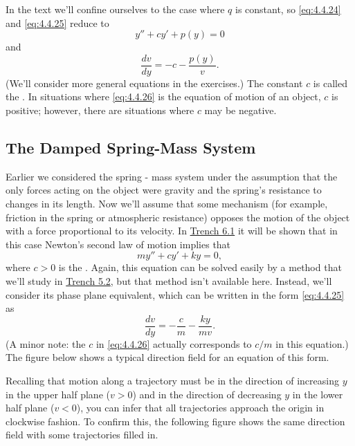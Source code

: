 \documentclass{ximera}
\begin{document}
In the text we'll confine ourselves to the case where $q$
is constant, so \eqref{eq:4.4.24} and \eqref{eq:4.4.25}  reduce to
\begin{equation} \label{eq:4.4.26}
y''+cy'+p(y)=0
\end{equation}
and
$$
\frac{dv}{dy}=-c-\frac{p(y)}{v}.
$$
(We'll consider more general equations in the exercises.) The constant
$c$ is called the . In situations where
\eqref{eq:4.4.26} is the equation of motion of an object, $c$ is positive;
however, there are situations where  $c$ may be negative.
 
\subsection*{The Damped Spring-Mass System}
 
Earlier we considered
the spring - mass system under the assumption that the only forces
acting on the object were gravity and the spring's resistance to
changes in its length. Now we'll assume that some mechanism (for
example, friction in the spring or atmospheric resistance) opposes the
motion of the object with a force proportional to its velocity. In \href{https://ximera.osu.edu/ode/main/springProblemsI/springProblemsI}{Trench 6.1} it will be shown that in this case Newton's
second law of motion implies that
\begin{equation} \label{eq:4.4.27}
my''+cy'+ky=0,
\end{equation}
where $c>0$ is the . Again, this
equation can
be solved easily by a method that we'll study in \href{https://ximera.osu.edu/ode/main/constantCoefficientHomogeneousEquations/constantCoefficientHomogeneousEquations}{Trench 5.2},
but that method isn't available here. Instead, we'll consider its
phase plane equivalent, which can be written in the form \eqref{eq:4.4.25}
as
\begin{equation} \label{eq:4.4.28}
\frac{dv}{dy}=-\frac{c}{m}-\frac{ky}{mv}.
\end{equation}
(A minor note: the $c$ in \eqref{eq:4.4.26} actually corresponds to
$c/m$ in this equation.) The figure below shows a
typical direction field for an equation of this form.


 
 
Recalling that
motion along a trajectory must be in the direction of increasing $y$
in the upper half plane ($v>0$) and in the direction of decreasing $y$
in the lower half plane ($v<0$), you can infer that all trajectories
approach the origin in clockwise fashion. To confirm this, the following figure shows the same direction field with some
trajectories filled in.
 
\end{document}
